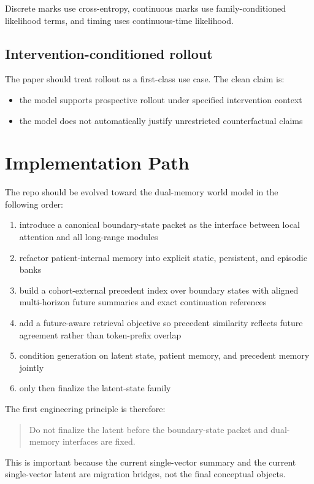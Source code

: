 \documentclass[11pt]{article}
\begin{document}
Discrete marks use cross-entropy, continuous marks use family-conditioned
likelihood terms, and timing uses continuous-time likelihood.

\subsection{Intervention-conditioned rollout}

The paper should treat rollout as a first-class use case. The clean claim is:
\begin{itemize}
    \item the model supports prospective rollout under specified intervention context
    \item the model does not automatically justify unrestricted counterfactual claims
\end{itemize}

\section{Implementation Path}

The repo should be evolved toward the dual-memory world model in the following
order:
\begin{enumerate}
    \item introduce a canonical boundary-state packet as the interface between local attention and all long-range modules
    \item refactor patient-internal memory into explicit static, persistent, and episodic banks
    \item build a cohort-external precedent index over boundary states with aligned multi-horizon future summaries and exact continuation references
    \item add a future-aware retrieval objective so precedent similarity reflects future agreement rather than token-prefix overlap
    \item condition generation on latent state, patient memory, and precedent memory jointly
    \item only then finalize the latent-state family
\end{enumerate}

The first engineering principle is therefore:
\begin{quote}
Do not finalize the latent before the boundary-state packet and dual-memory
interfaces are fixed.
\end{quote}

This is important because the current single-vector summary and the current
single-vector latent are migration bridges, not the final conceptual objects.
\end{document}

